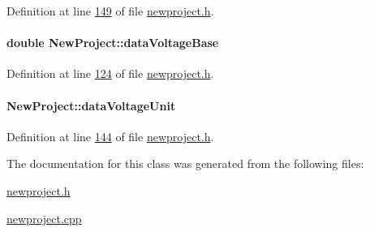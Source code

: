Definition at line \hyperlink{newproject_8h_source_l00149}{149} of file \hyperlink{newproject_8h_source}{newproject.\+h}.

\hypertarget{class_new_project_a21dc54f9c0c8a59ca33eaa42cb9f9352}{}
\paragraph[{data\+Voltage\+Base}]{\setlength{\rightskip}{0pt plus 5cm}double New\+Project\+::data\+Voltage\+Base}\label{class_new_project_a21dc54f9c0c8a59ca33eaa42cb9f9352}


Definition at line \hyperlink{newproject_8h_source_l00124}{124} of file \hyperlink{newproject_8h_source}{newproject.\+h}.

\hypertarget{class_new_project_a04187cd16b01b80dcdef9107e4c83a28}{}
\paragraph[{data\+Voltage\+Unit}]{ New\+Project\+::data\+Voltage\+Unit}\label{class_new_project_a04187cd16b01b80dcdef9107e4c83a28}


Definition at line \hyperlink{newproject_8h_source_l00144}{144} of file \hyperlink{newproject_8h_source}{newproject.\+h}.



The documentation for this class was generated from the following files\+:\begin{DoxyCompactItemize}
\item 
\hyperlink{newproject_8h}{newproject.\+h}\item 
\hyperlink{newproject_8cpp}{newproject.\+cpp}\end{DoxyCompactItemize}
